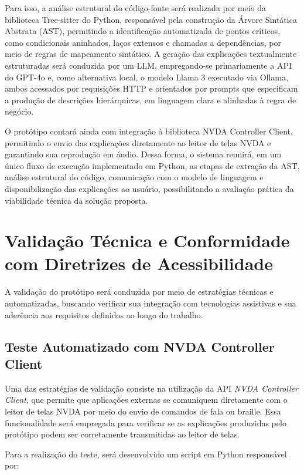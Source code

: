 \documentclass[
    12pt,                   %
    openright,              %
    oneside,                %
    a4paper,                %
    sumario=tradicional,    %
    english,                %
    brazil,                 %
    ]{abntex2}
\begin{document}
Para isso, a análise estrutural do código-fonte será realizada por meio da biblioteca Tree-sitter do Python, responsável pela construção da Árvore Sintática Abstrata (AST), permitindo a identificação automatizada de pontos críticos, como condicionais aninhados, laços extensos e chamadas a dependências, por meio de regras de mapeamento sintático. A geração das explicações textualmente estruturadas será conduzida por um LLM, empregando-se primariamente a API do GPT-4o e, como alternativa local, o modelo Llama 3 executado via Ollama, ambos acessados por requisições HTTP e orientados por prompts que especificam a produção de descrições hierárquicas, em linguagem clara e alinhadas à regra de negócio.

O protótipo contará ainda com integração à biblioteca NVDA Controller Client, permitindo o envio das explicações diretamente ao leitor de telas NVDA e garantindo sua reprodução em áudio. Dessa forma, o sistema reunirá, em um único fluxo de execução implementado em Python, as etapas de extração da AST, análise estrutural do código, comunicação com o modelo de linguagem e disponibilização das explicações ao usuário, possibilitando a avaliação prática da viabilidade técnica da solução proposta.


\section{Validação Técnica e Conformidade com Diretrizes de Acessibilidade}

A validação do protótipo será conduzida por meio de estratégias técnicas e automatizadas, buscando verificar sua integração com tecnologias assistivas e sua aderência aos requisitos definidos ao longo do trabalho.

\subsection{Teste Automatizado com NVDA Controller Client}

Uma das estratégias de validação consiste na utilização da API \textit{NVDA Controller Client}, que permite que aplicações externas se comuniquem diretamente com o leitor de telas NVDA por meio do envio de comandos de fala ou braille. Essa funcionalidade será empregada para verificar se as explicações produzidas pelo protótipo podem ser corretamente transmitidas ao leitor de telas.

Para a realização do teste, será desenvolvido um script em Python responsável por:
\end{document}
